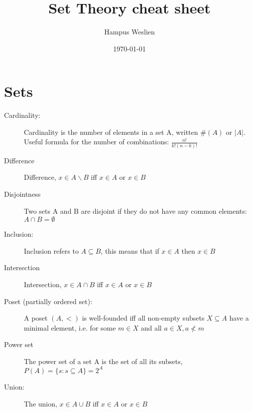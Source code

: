 \documentclass[12pt]{article}
\title{Set Theory cheat sheet}
\author{Hampus Weslien}
\date{\today}
\begin{document}
\maketitle
\clearpage


\section{Sets}
\begin{description}
\item[Cardinality:] Cardinality is the number of elements in a set A, written $\#(A)$ or $\left|A\right|$. Useful formula for the number of combinations: $\frac{n!}{k!(n-k)!}$

\item[Difference] Difference, $x \in A\backslash B$ iff $x \in A$ or $x \in B$

\item[Disjointness] Two sets A and B are disjoint if they do not have any common elements: $A \cap B = \emptyset$

\item[Inclusion:] Inclusion refers to $A\subseteq B$, this means that if $x \in A$ then $x \in B$

\item[Intersection] Intersection, $x \in A \cap B$ iff $x \in A$ or $x \in B$

\item[Poset (partially ordered set):] A poset $(A,<)$ is well-founded iff all non-empty subsets $X \subseteq A$ have a minimal element, i.e.  for some $m \in X$ and all $a \in X, a \not< m$

\item[Power set] The power set of a set A is the set of all its subsets, \\ $P(A) = \{s: s \subseteq A \} = 2^A$ 

\item[Union:] The union, $x \in A \cup B$ iff $x \in A$ or $x \in B$
\end{description}
\end{document}
